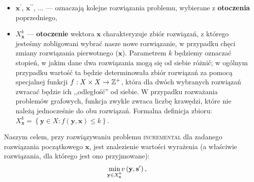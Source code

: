 \begin{itemize}
	\item $\textbf{x}^{\prime}$, $\textbf{x}^{\prime\prime}$, $\dots$ --- oznaczają kolejne rozwiązania problemu, wybierane z \textbf{otoczenia} poprzedniego,
	\item $X^{k}_{\textbf{x}}$ --- \textbf{otoczenie} wektora $\textbf{x}$ charakteryzuje zbiór rozwiązań, z którego jesteśmy zobligowani wybrać nasze nowe rozwiązanie, w przypadku chęci zmiany rozwiązania pierwotnego ($\textbf{x}$). Parametrem $k$ będziemy oznaczać stopień, w jakim dane dwa rozwiązania mogą się od siebie różnić; w ogólnym przypadku wartość ta będzie determinowała zbiór rozwiązań za pomocą specjalnej funkcji $f : X \times X \rightarrow \mathbb{Z}^{+}$, która dla dwóch wybranych rozwiązań zwracać będzie ich ,,odległość'' od siebie.  W przypadku rozważania problemów grafowych, funkcja zwykle zwraca liczbę krawędzi, które nie należą jednocześnie do obu rozwiązań. Formalna definicja zbioru: $X^{k}_{\textbf{x}} = \left\{ \textbf{y} \in X : f \left( \textbf{y}, \textbf{x} \right) \leqslant k \right\}$.
\end{itemize}
Naszym celem, przy rozwiązywaniu problemu \textsc{incremental} dla zadanego rozwiązania początkowego $\textbf{x}$, jest znalezienie wartości wyrażenia (a właściwie rozwiązania, dla którego jest ono przyjmowane):
\begin{equation}
	\min_{\mathclap{\textbf{y} \in X^{k}_{\textbf{x}}}} v \left( \textbf{y}, \textbf{s}^{\prime} \right)\text{,}
\end{equation}\label{eq:imst}
